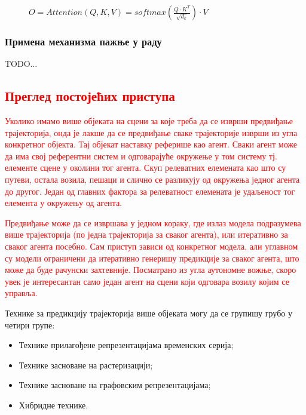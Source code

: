 \documentclass[11pt,oneside]{memoir}
\begin{document}
\begin{figure}[H]
  \centering
  $O = Attention(Q, K, V) = softmax(\frac{Q\cdot K^T}{\sqrt{d_k}})\cdot V$
\end{figure}

\subsection{Примена механизма пажње у раду}

TODO...

\textcolor{red}{\chapter{Преглед постојећих приступа}}
\label{chp:razrada}

\textcolor{red}{Уколико имамо више објеката на сцени за које треба да се изврши предвиђање трајекторија, онда је лакше да се предвиђање сваке 
трајекторије изврши из угла конкретног објекта. Тај објекат наставку реферише као агент. Сваки агент може да има свој референтни систем
и одговарајуће окружење у том систему тј. елементе сцене у околини тог агента. Скуп релеватних елемената као што су путеви, остала возила, пешаци и слично се
разликују од окружења једног агента до другог. Један од главних фактора за релеватност елемената је удаљеност тог елемента у окружењу од агента.}

\textcolor{red}{Предвиђање може да се извршава у једном кораку, где излаз модела подразумева више трајекторија (по једна трајекторија за сваког агента), 
или итеративно за сваког агента посебно. Сам приступ зависи од конкретног модела, 
али углавном су модели ограничени да итеративно генеришу предикције за сваког агента, што може да буде рачунски захтевније. 
Посматрано из угла аутономне вожње, скоро увек је интересантан само један агент на сцени који одговара возилу којим се управља.}

Технике за предикцију трајекторија више објеката могу да се групишу грубо у четири групе:
\begin{itemize}
  \item Технике прилагођене репрезентацијама временских серија;
  \item Технике засноване на растеризацији;
  \item Технике засноване на графовским репрезентацијама;
  \item Хибридне технике.
\end{itemize}
\end{document}
